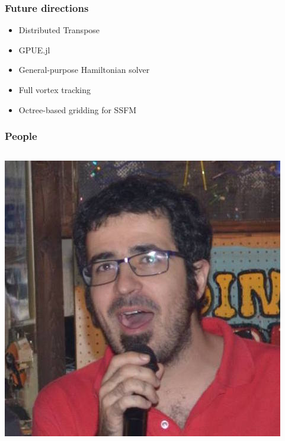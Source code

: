 \documentclass{beamer}
\begin{document}
\begin{frame}
\frametitle{Future directions}
\begin{itemize}
\item Distributed Transpose
\item GPUE.jl
\item General-purpose Hamiltonian solver
\item Full vortex tracking
\item Octree-based gridding for SSFM
\end{itemize}
\end{frame}

\begin{frame}
\frametitle{People}
\begin{columns}
\begin{columns}
\includegraphics[width=\textwidth]{ABC.jpg}

\end{columns}
\end{columns}
\end{frame}
\end{document}
